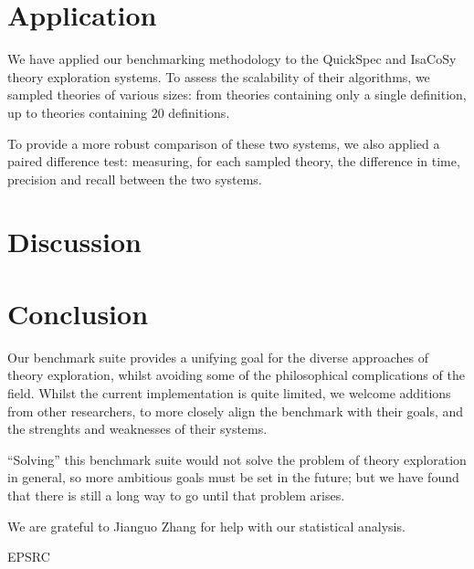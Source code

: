 \section{Application}
\label{sec:application}


We have applied our benchmarking methodology to the QuickSpec and IsaCoSy theory
exploration systems. To assess the scalability of their algorithms, we sampled
theories of various sizes: from theories containing only a single definition, up
to theories containing 20 definitions.

To provide a more robust comparison of these two systems, we also applied a
paired difference test: measuring, for each sampled theory, the difference in
time, precision and recall between the two systems.

\section{Discussion}
\label{sec:application}


\section{Conclusion}
\label{sec:conclusion}


Our benchmark suite provides a unifying goal for the diverse approaches of
theory exploration, whilst avoiding some of the philosophical complications of
the field. Whilst the current implementation is quite limited, we welcome
additions from other researchers, to more closely align the benchmark with their
goals, and the strenghts and weaknesses of their systems.

``Solving'' this benchmark suite would not solve the problem of theory exploration in general,
so more ambitious goals must be set in the future; but we have found that there is still a
long way to go until that problem arises.

\begin{acknowledgements}
  We are grateful to Jianguo Zhang for help with our statistical analysis.

  EPSRC
\end{acknowledgements}





